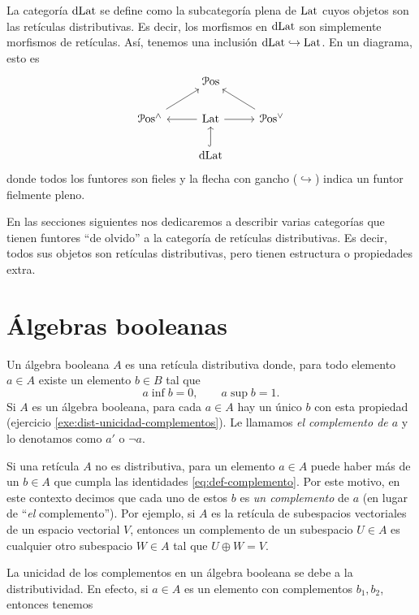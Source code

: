 La categoría $\mathrm{dLat}$ se define como la subcategoría plena de
$\mathrm{Lat}$ cuyos objetos son las retículas distributivas.
Es decir, los morfismos en $\mathrm{dLat}$ son simplemente morfismos de
retículas. Así, tenemos una inclusión $\mathrm{dLat}\hookrightarrow\mathrm{Lat}$.
En un diagrama, esto es
\[
    \begin{tikzcd}
        & \Pos \\
        \Pos^\wedge \arrow[ru]
            & \Lat \arrow[r] \arrow[l]
            & \Pos^\vee \arrow[lu] \\
        & \DLat \arrow[u,hook]
    \end{tikzcd}
\]
donde todos los funtores son fieles y la flecha con gancho
($\hookrightarrow$) indica un funtor fielmente pleno.

En las secciones siguientes nos dedicaremos a describir varias
categorías que tienen funtores ``de olvido'' a la categoría de
retículas distributivas. Es decir, todos sus objetos son retículas
distributivas, pero tienen estructura o propiedades extra.

\section{Álgebras booleanas}
\label{ss:complementos-algebras-booleanas}

\begin{definition}
  Un álgebra booleana $A$ es una retícula distributiva
  donde, para todo elemento $a\in A$ existe un elemento $b\in B$ tal
  que
  \begin{equation}\label{eq:def-complemento}
    a\inf b = 0, \qquad a\sup b = 1.
  \end{equation}
  Si $A$ es un álgebra booleana, para cada $a\in A$ hay un único $b$
  con esta propiedad (ejercicio \ref{exe:dist-unicidad-complementos}).
  Le llamamos \emph{el complemento de $a$} y lo denotamos como $a'$ o
  $\neg a$.
\end{definition}

Si una retícula $A$ no es distributiva, para un elemento $a\in A$
puede haber más de un $b\in A$ que cumpla las identidades
\ref{eq:def-complemento}. Por este motivo, en este contexto decimos
que cada uno de estos $b$ es \emph{un complemento} de $a$ (en lugar de
``\emph{el} complemento'').
Por ejemplo, si $A$ es la retícula de
subespacios vectoriales de un espacio vectorial $V$,
entonces un complemento de un subespacio $U\in A$ es cualquier otro
subespacio $W\in A$ tal que $U\oplus W=V$.

La unicidad de los complementos en un álgebra booleana se debe
a la distributividad. En efecto, si $a\in A$ es un elemento con
complementos $b_1,b_2$, entonces tenemos

